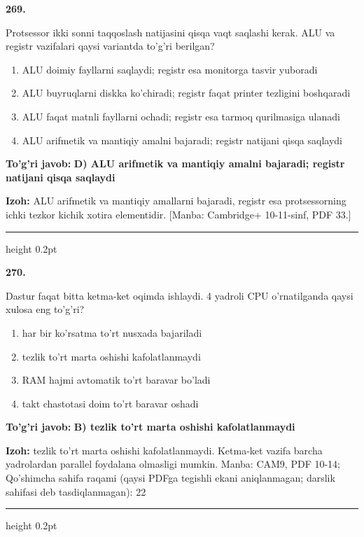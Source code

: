 \documentclass[10pt,a4paper]{article}
\begin{document}
{\bfseries\sffamily\color{ink} 269.}
\par
Protsessor ikki sonni taqqoslash natijasini qisqa vaqt saqlashi kerak. ALU va registr vazifalari qaysi variantda to'g'ri berilgan?
\begin{enumerate}[label=\Alph*),leftmargin=9mm]
\item ALU doimiy fayllarni saqlaydi; registr esa monitorga tasvir yuboradi
\item ALU buyruqlarni diskka ko'chiradi; registr faqat printer tezligini boshqaradi
\item ALU faqat matnli fayllarni ochadi; registr esa tarmoq qurilmasiga ulanadi
\item ALU arifmetik va mantiqiy amalni bajaradi; registr natijani qisqa saqlaydi
\end{enumerate}
\begin{tcolorbox}[enhanced,breakable,colback=teal!4,colframe=teal!60!black,boxrule=0.45pt,arc=1.2mm,left=2.7mm,right=2.7mm,top=1.8mm,bottom=1.8mm,before skip=2mm,after skip=2mm]
{\bfseries\sffamily\color{teal}To'g'ri javob:} \textbf{D) ALU arifmetik va mantiqiy amalni bajaradi; registr natijani qisqa saqlaydi}
\par\smallskip
{\bfseries Izoh:} ALU arifmetik va mantiqiy amallarni bajaradi, registr esa protsessorning ichki tezkor kichik xotira elementidir. [Manba: Cambridge+ 10-11-sinf, PDF 33.]
\end{tcolorbox}
\vspace{2mm}\hrule height 0.2pt\vspace{3mm}

{\bfseries\sffamily\color{ink} 270.}
\par
Dastur faqat bitta ketma-ket oqimda ishlaydi. 4 yadroli CPU o'rnatilganda qaysi xulosa eng to'g'ri?
\begin{enumerate}[label=\Alph*),leftmargin=9mm]
\item har bir ko'rsatma to'rt nusxada bajariladi
\item tezlik to'rt marta oshishi kafolatlanmaydi
\item RAM hajmi avtomatik to'rt baravar bo'ladi
\item takt chastotasi doim to'rt baravar oshadi
\end{enumerate}
\begin{tcolorbox}[enhanced,breakable,colback=teal!4,colframe=teal!60!black,boxrule=0.45pt,arc=1.2mm,left=2.7mm,right=2.7mm,top=1.8mm,bottom=1.8mm,before skip=2mm,after skip=2mm]
{\bfseries\sffamily\color{teal}To'g'ri javob:} \textbf{B) tezlik to'rt marta oshishi kafolatlanmaydi}
\par\smallskip
{\bfseries Izoh:} tezlik to'rt marta oshishi kafolatlanmaydi. Ketma-ket vazifa barcha yadrolardan parallel foydalana olmasligi mumkin. Manba: CAM9, PDF 10-14; Qo'shimcha sahifa raqami (qaysi PDFga tegishli ekani aniqlanmagan; darslik sahifasi deb tasdiqlanmagan): 22
\end{tcolorbox}
\vspace{2mm}\hrule height 0.2pt\vspace{3mm}
\end{document}
